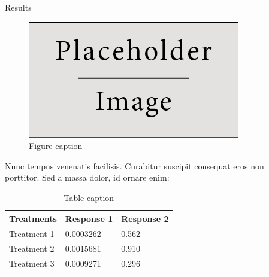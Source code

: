\documentclass[final]{beamer}
\newlength{\sepwid}
\newlength{\onecolwid}
\newlength{\twocolwid}
\begin{document}
\begin{frame}[t]
\begin{columns}[t]
\begin{column}{\twocolwid}
\begin{columns}[t,totalwidth=\twocolwid]
\begin{column}{\onecolwid}
\begin{block}{Results}
						\begin{figure}
							\includegraphics[width=0.8\linewidth]{placeholder.jpg}
							\caption{Figure caption}
						\end{figure}

						Nunc tempus venenatis facilisis. Curabitur suscipit consequat eros non porttitor. Sed a massa dolor, id ornare enim:

						\begin{table}
							\vspace{2ex}
							\begin{tabular}{l l l}
								\toprule
								\textbf{Treatments} & \textbf{Response 1} & \textbf{Response 2} \\
								\midrule
								Treatment 1         & 0.0003262           & 0.562               \\
								Treatment 2         & 0.0015681           & 0.910               \\
								Treatment 3         & 0.0009271           & 0.296               \\
								\bottomrule
							\end{tabular}
							\caption{Table caption}
						\end{table}

					\end{block}


				\end{column} %

			\end{columns} %

		\end{column} %

		\begin{column}{\sepwid}\end{column} %


\end{columns}
\end{frame}
\end{document}
